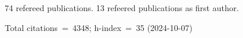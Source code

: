 74 refereed publications. 13 refeered publications as first author.

Total citations~=~4348; h-index~=~35 (2024-10-07)